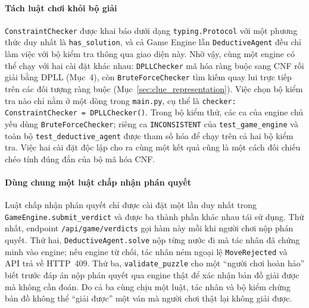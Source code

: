 \begin{sloppypar}
\paragraph{Tách luật chơi khỏi bộ giải}
\texttt{ConstraintChecker} được khai báo dưới dạng \texttt{typing.Protocol} với
một phương thức duy nhất là \texttt{has\_solution}, và cả Game Engine lẫn
\texttt{DeductiveAgent} đều chỉ làm việc với bộ kiểm tra thông qua giao diện này.
Nhờ vậy, cùng một engine có thể chạy với hai cài đặt khác nhau: \texttt{DPLLChecker}
mã hóa ràng buộc sang CNF rồi giải bằng DPLL (Mục~4), còn \texttt{BruteForceChecker}
tìm kiếm quay lui trực tiếp trên các đối tượng ràng buộc
(Mục~\ref{sec:clue_representation}). Việc chọn bộ kiểm tra nào chỉ nằm ở một
dòng trong \texttt{main.py}, cụ thể là \texttt{checker: ConstraintChecker =
DPLLChecker()}. Trong bộ kiểm thử, các ca của engine chủ yếu dùng
\texttt{BruteForceChecker}; riêng ca \texttt{INCONSISTENT} của
\texttt{test\_game\_engine} và toàn bộ \texttt{test\_deductive\_agent} được tham
số hóa để chạy trên cả hai bộ kiểm tra. Việc hai cài đặt độc lập cho ra cùng
một kết quả cũng là một cách đối chiếu chéo tính đúng đắn của bộ mã hóa CNF.

\paragraph{Dùng chung một luật chấp nhận phán quyết}
Luật chấp nhận phán quyết chỉ được cài đặt một lần duy nhất trong
\texttt{GameEngine.submit\_verdict} và được ba thành phần khác nhau tái sử dụng.
Thứ nhất, endpoint \nolinkurl{/api/game/verdicts} gọi hàm này mỗi khi người chơi
nộp phán quyết. Thứ hai, \texttt{DeductiveAgent.solve} nộp từng nước đi mà tác
nhân đã chứng minh vào engine; nếu engine từ chối, tác nhân ném ngoại lệ
\texttt{MoveRejected} và API trả về HTTP~409. Thứ ba, \texttt{validate\_puzzle}
cho một ``người chơi hoàn hảo'' biết trước đáp án nộp phán quyết qua engine thật
để xác nhận bản đồ giải được mà không cần đoán. Do cả ba cùng chịu một luật, tác
nhân và bộ kiểm chứng bản đồ không thể ``giải được'' một ván mà người chơi thật
lại không giải được.


\end{sloppypar}
